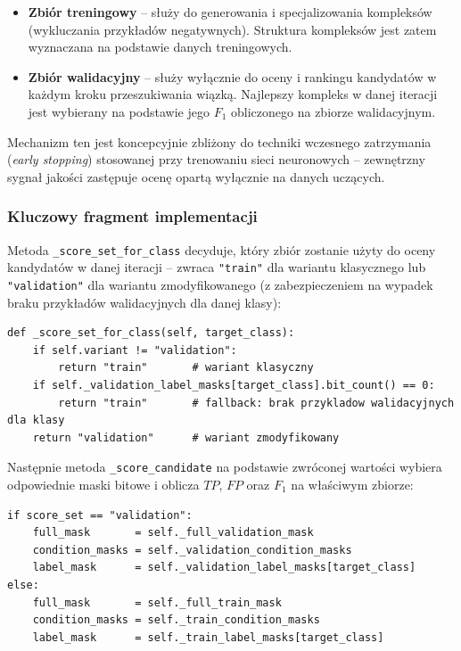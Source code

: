 \documentclass[12pt,a4paper]{article}
\begin{document}
\begin{itemize}
  \item \textbf{Zbiór treningowy} -- służy do generowania i specjalizowania kompleksów
        (wykluczania przykładów negatywnych). Struktura kompleksów jest zatem
        wyznaczana na podstawie danych treningowych.
  \item \textbf{Zbiór walidacyjny} -- służy wyłącznie do oceny i rankingu kandydatów
        w każdym kroku przeszukiwania wiązką. Najlepszy kompleks w danej iteracji
        jest wybierany na podstawie jego $F_1$ obliczonego na zbiorze walidacyjnym.
\end{itemize}

Mechanizm ten jest koncepcyjnie zbliżony do techniki wczesnego zatrzymania
(\emph{early stopping}) \cite{bishop2006} stosowanej przy trenowaniu sieci neuronowych --
zewnętrzny sygnał jakości zastępuje ocenę opartą wyłącznie na danych uczących.

\subsubsection*{Kluczowy fragment implementacji}

Metoda \texttt{\_score\_set\_for\_class} decyduje, który zbiór zostanie użyty
do oceny kandydatów w danej iteracji -- zwraca \texttt{"train"} dla wariantu
klasycznego lub \texttt{"validation"} dla wariantu zmodyfikowanego
(z zabezpieczeniem na wypadek braku przykładów walidacyjnych dla danej klasy):

\begin{lstlisting}
def _score_set_for_class(self, target_class):
    if self.variant != "validation":
        return "train"       # wariant klasyczny
    if self._validation_label_masks[target_class].bit_count() == 0:
        return "train"       # fallback: brak przykladow walidacyjnych dla klasy
    return "validation"      # wariant zmodyfikowany
\end{lstlisting}

Następnie metoda \texttt{\_score\_candidate} na podstawie zwróconej wartości
wybiera odpowiednie maski bitowe i oblicza $\mathit{TP}$, $\mathit{FP}$
oraz $F_1$ na właściwym zbiorze:

\begin{lstlisting}
if score_set == "validation":
    full_mask       = self._full_validation_mask
    condition_masks = self._validation_condition_masks
    label_mask      = self._validation_label_masks[target_class]
else:
    full_mask       = self._full_train_mask
    condition_masks = self._train_condition_masks
    label_mask      = self._train_label_masks[target_class]
\end{lstlisting}
\end{document}
